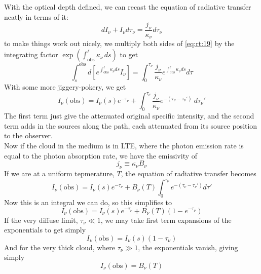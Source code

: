 \documentclass[10pt]{article}
\numberwithin{equation}{section}
\newcommand{\n}{\noindent}
\begin{document}
\n With the optical depth defined, we can recast the equation of radiative
transfer neatly in terms of it:
\begin{equation}
  \label{eq:rt:19} dI_\nu + I_\nu d\tau_\nu = \frac{j_\nu}{\kappa_\nu}d\tau_\nu
\end{equation}
to make things work out nicely, we multiply both sides of \eqref{eq:rt:19} by
the integrating factor
$\exp\left(\int_{\mathrm{obs}}^\ell\kappa_\nu\,ds\right)$ to get
\begin{equation}
  \label{eq:rt:20} \int_s^{\mathrm{obs}}d\left[e^{\int_{\mathrm{obs}}^\ell
  \kappa_\nu ds}I_\nu\right] = \int_0^{\tau_\nu} \frac{j_\nu}{\kappa_\nu}
  e^{\int_{\mathrm{obs}}^\ell \kappa_\nu ds}d\tau
\end{equation}
With some more jiggery-pokery, we get
\begin{equation}
  \label{eq:rt:21} \boxed{I_\nu(\mathrm{obs}) = I_\nu(s)e^{-\tau_\nu} +
  \int_0^{\tau_\nu} \frac{j_\nu}{\kappa_\nu} e^{-(\tau_\nu - \tau_\nu')}\
  d\tau_\nu'} \end{equation}
The first term just give the attenuated original specific intensity, and the
second term adds in the sources along the path, each attenuated from its source
position to the observer.\\

\n Now if the cloud in the medium is in LTE, where the photon emission rate is
equal to the photon absorption rate, we have the emissivity of
\begin{equation}
  \label{eq:rt:22} j_\nu \equiv \kappa_\nu B_\nu
\end{equation}
If we are at a uniform tepmerature, $T$, the equation of radiative transfer
becomes
\begin{equation}
  \label{eq:rt:23} I_\nu(\mathrm{obs}) = I_\nu(s)e^{-\tau_\nu} +
  B_\nu(T)\int_0^{\tau_\nu}e^{-(\tau_\nu - \tau_\nu')}d\tau'
\end{equation}
Now this is an integral we can do, so this simplifies to
\begin{equation}
  \label{eq:rt:24} \boxed{I_\nu(\mathrm{obs}) = I_\nu(s) e^{-\tau_\nu} +
  B_\nu(T) \left(1- e^{-\tau_\nu}\right)}
\end{equation}
If the very diffuse limit, $\tau_\nu \ll 1$, we may take first term expansions
of the exponentials to get simply
\begin{equation}
  \label{eq:rt:25} I_\nu(\mathrm{obs}) = I_\nu(s)(1-\tau_\nu)
\end{equation}
And for the very thick cloud, where $\tau_\nu \gg 1$, the exponentials vanish,
giving simply
\begin{equation}
  \label{eq:rt:26} I_\nu(\mathrm{obs}) = B_\nu(T)
\end{equation}
\end{document}
